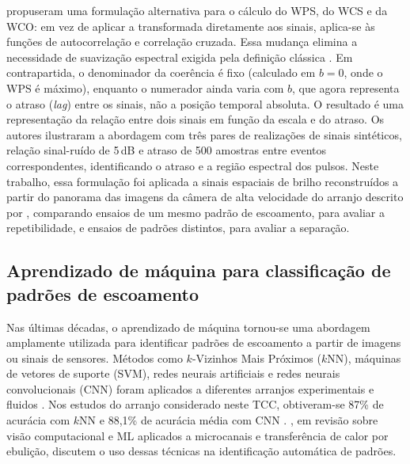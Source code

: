  propuseram uma formulação alternativa para o cálculo do WPS, do
WCS e da WCO: em vez de aplicar a transformada diretamente aos sinais, aplica-se às
funções de autocorrelação e correlação cruzada. Essa mudança elimina a necessidade de
suavização espectral exigida pela definição clássica \cite{torrence1998}. Em contrapartida,
o denominador da coerência é fixo (calculado em $b = 0$, onde o WPS é máximo), enquanto o
numerador ainda varia com $b$, que agora representa o atraso (\textit{lag}) entre os
sinais, não a posição temporal absoluta. O resultado é uma representação
da relação entre dois sinais em função da escala e do
atraso. Os autores ilustraram a abordagem com três pares de realizações de sinais
sintéticos, relação sinal-ruído de 5\,dB e atraso de 500 amostras entre eventos
correspondentes, identificando o atraso e a região espectral dos pulsos.
Neste trabalho, essa formulação foi aplicada a sinais
espaciais de brilho reconstruídos a partir do panorama das imagens da câmera de alta
velocidade do arranjo descrito por , comparando ensaios de um mesmo
padrão de escoamento, para avaliar a repetibilidade, e ensaios de padrões distintos, para
avaliar a separação.

\subsection{Aprendizado de máquina para classificação de padrões de escoamento}\label{sec:rev-ml}

Nas últimas décadas, o aprendizado de máquina tornou-se uma abordagem amplamente utilizada
para identificar padrões de escoamento a partir de imagens ou sinais de sensores. Métodos
como $k$-Vizinhos Mais Próximos ($k$NN), máquinas de vetores de suporte (SVM), redes
neurais artificiais e redes neurais convolucionais (CNN) foram aplicados a diferentes
arranjos experimentais e fluidos \cite{brunton2020,yang2023}. Nos estudos do
arranjo considerado neste TCC, obtiveram-se 87\% de acurácia com $k$NN e
88{,}1\% de acurácia média com CNN \cite{dias2025knn,dias2025cnn}.
, em revisão sobre visão computacional e ML aplicados a microcanais
e transferência de calor por ebulição, discutem o uso dessas técnicas na identificação
automática de padrões.

